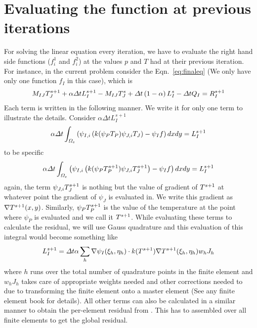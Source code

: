 \documentclass[preprint,12pt]{elsarticle}
\numberwithin{equation}{section}
\begin{document}
\section{Evaluating the function at previous iterations}
For solving the linear equation every iteration, we have to evaluate the right hand side functions ($f_i^1$ and $f_i^2$) at the values  $p$ and $T$ had at their previous iteration. For instance, in the current problem consider the Eqn.~\ref{eq:finaleq} (We only have only one function $f_I$ in this case), which is 
\begin{equation}
		M_{IJ}T_{J}^{s+1} +	\alpha \Delta t L_I^{s+1}  - M_{IJ}T_{J}^s + \Delta t \left( 1-\alpha \right) L_I^s - \Delta t Q_I = R_I^{s+1}
		\label{eq:per}
\end{equation}
Each term is written in the following manner. We write it for only one term to illustrate the details. 
Consider $\alpha \Delta t L_I^{s+1} $
\begin{equation}
\alpha \Delta t	\int_{\Omega_e} \left( \psi_{I,i} \left( k (\psi_PT_P) \psi_{J,i}T_J \right) - \psi_I f \right)  dx dy = L_I^{s+1}
\end{equation}
to be specific
\begin{equation}
	\alpha \Delta t	\int_{\Omega_e} \left( \psi_{I,i} \left( k (\psi_PT_P^{s+1}) \psi_{J,i}T_J^{s+1} \right) - \psi_I f \right)  dx dy = L_I^{s+1}
\end{equation}
again, the term $\psi_{J,i} T_J^{s+1}$ is nothing but the value of gradient of $T^{s+1}$ at whatever point the gradient of $\psi_{J}$ is evaluated in. We write this gradient as $\nabla T^{s+1}(x,y)$. Similarly, $\psi_PT_P^{s+1}$ is the value of the temperature at the point where $\psi_P$ is evaluated and we call it $T^{s+1}$. While evaluating these terms to calculate the residual, we will use Gauss quadrature and this evaluation of this integral would become something like
\begin{equation}
L_I^{s+1} =	\Delta {t} \alpha \sum_{h} \nabla \psi_I (\xi_h,\eta_h) \cdot k(T^{s+1}) \nabla  T^{s+1}(\xi_h,\eta_h) w_hJ_h
\end{equation}
where $h$ runs over the total number of quadrature points in the finite element and $w_hJ_h$ takes care of appropriate weights needed and other corrections needed to due to transforming the finite element onto a master element (See any finite element book for details). All other terms can also be calculated in a similar manner to obtain the per-element residual from . This has to assembled over all finite elements to get the global residual.
\end{document}

